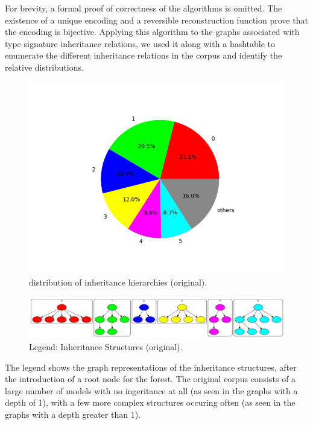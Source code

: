 \documentclass[conference]{IEEEtran}
\begin{document}
For brevity, a formal proof of correctness of the algorithms is omitted. The existence of a unique encoding and a reversible reconstruction function prove that the encoding is bijective. Applying this algorithm to the graphs associated with type signature inheritance relations, we used it along with a hashtable to enumerate the different inheritance relations in the corpus and identify the relative distributions.


\begin{figure}[htbp]
    \centerline{\includegraphics[width=\linewidth]{"./distribution of inheritance hierarchies (original).png"}}
    \caption{distribution of inheritance hierarchies (original).}
    \label{fig}
    \end{figure}

    \begin{figure}[htbp]
        \centerline{\includegraphics[width=\linewidth]{"./out/original.png"}}
        \caption{Legend: Inheritance Structures (original).}
        \label{fig}
        \end{figure}


The legend shows the graph representations of the inheritance structures, after the introduction of a root node for the forest. The original corpus consists of a large number of models with no ingeritance at all (as seen in the graphs with a depth of 1), with a few more complex structures occuring often (as seen in the graphs with a depth greater than 1).
    
\end{document}
